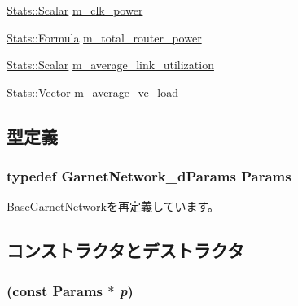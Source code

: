 \begin{DoxyCompactItemize}
\item 
\hyperlink{classStats_1_1Scalar}{Stats::Scalar} \hyperlink{classGarnetNetwork__d_a4838d810580523f7dcb78f70bf1e4f12}{m\_\-clk\_\-power}
\item 
\hyperlink{classStats_1_1Formula}{Stats::Formula} \hyperlink{classGarnetNetwork__d_ae7629b040e81ae59a25acc0231c7e182}{m\_\-total\_\-router\_\-power}
\item 
\hyperlink{classStats_1_1Scalar}{Stats::Scalar} \hyperlink{classGarnetNetwork__d_a980fb21ae994fd27b0f9a935aa21edee}{m\_\-average\_\-link\_\-utilization}
\item 
\hyperlink{classStats_1_1Vector}{Stats::Vector} \hyperlink{classGarnetNetwork__d_aeaf247f4cb25e8bbafa5d0e629e6be10}{m\_\-average\_\-vc\_\-load}
\end{DoxyCompactItemize}


\subsection{型定義}
\hypertarget{classGarnetNetwork__d_aa723bef17ce7ec9b7c3ad12002aef3bb}{
\subsubsection[{Params}]{\setlength{\rightskip}{0pt plus 5cm}typedef GarnetNetwork\_\-dParams {\bf Params}}}
\label{classGarnetNetwork__d_aa723bef17ce7ec9b7c3ad12002aef3bb}


\hyperlink{classBaseGarnetNetwork_a9b387eae2084a167c00ec5550159a245}{BaseGarnetNetwork}を再定義しています。

\subsection{コンストラクタとデストラクタ}
\hypertarget{classGarnetNetwork__d_aa03daae532d5b6e0e29ca3a1fe3050c2}{
\subsubsection[{GarnetNetwork\_\-d}]{ (const {\bf Params} $\ast$ {\em p})}}
\label{classGarnetNetwork__d_aa03daae532d5b6e0e29ca3a1fe3050c2}



